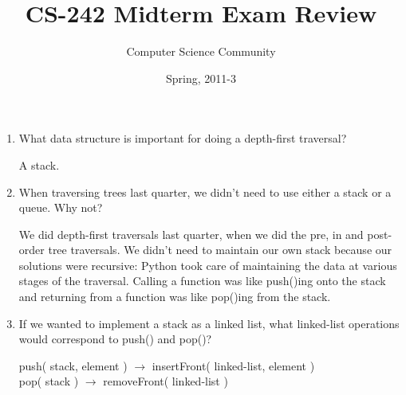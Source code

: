 \documentclass[11pt]{article}
\author{Computer Science Community}
\title{CS-242 Midterm Exam Review}
\date{Spring, 2011-3}
\makeatletter
\newenvironment{answer}{\large\lstset{basicstyle=\large}\color{white}}{}
\newenvironment{answer}{\large\lstset{basicstyle=\large}\color{red}}{}
\let\thetitle\@title
\let\thedate\@date
\makeatother
\begin{document}
\noindent{\Large \thetitle \hfill \thedate}

\begin{enumerate}
\section*{Stacks and Queues}
    \item What data structure is important for doing a depth-first traversal?

        \begin{answer}
        A stack.
        \end{answer}

    \item When traversing trees last quarter, we didn't need to use either a
        stack or a queue. Why not?

        \begin{answer}
        We did depth-first traversals last quarter, when we did the pre, in and
        post-order tree traversals. We didn't need to maintain our own stack
        because our solutions were recursive: Python took care of maintaining
        the data at various stages of the traversal. Calling a function was
        like push()ing onto the stack and returning from a function was like
        pop()ing from the stack.
        \end{answer}

    \item If we wanted to implement a stack as a linked list, what linked-list
        operations would correspond to push() and pop()?

        \begin{answer}
        push( stack, element ) $\rightarrow$ insertFront( linked-list, element )\\
        pop( stack ) $\rightarrow$ removeFront( linked-list )
        \end{answer}
        

\end{enumerate}
\end{document}
